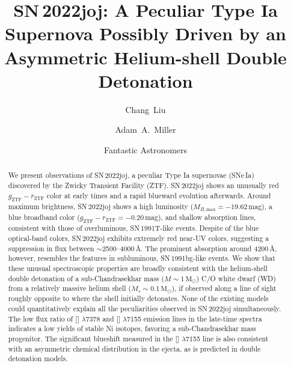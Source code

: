 \documentclass[twocolumn]{aastex631}
\begin{document}
\begin{CJK*}{UTF8}{gbsn}

\title{SN\,2022joj: A Peculiar Type Ia Supernova Possibly Driven by an Asymmetric Helium-shell Double Detonation}

\author[0000-0002-7866-4531]{Chang~Liu}

\author[0000-0001-9515-478X]{Adam~A.~Miller}

\author{Fantastic Astronomers}
\begin{abstract} 
%
We present observations of SN\,2022joj, a peculiar Type Ia supernovae (SNe\,Ia) discovered by the Zwicky Transient Facility (ZTF). SN\,2022joj shows an unusually red $g_\mathrm{ZTF}-r_\mathrm{ZTF}$ color at early times and a rapid blueward evolution afterwards. Around maximum brightness, SN\,2022joj shows a high luminosity ($M_{B,\mathrm{max}}=-19.62$\,mag), a blue broadband color ($g_\mathrm{ZTF}-r_\mathrm{ZTF}=-0.20$\,mag), and shallow  absorption lines, consistent with those of overluminous, SN\,1991T-like events. Despite of the blue optical-band colors, SN\,2022joj exhibits extremely red near-UV colors, suggesting a suppression in flux between $\sim$2500--4000\,\r{A}. The prominent absorption around 4200\,\r{A}, however, resembles the  features in subluminous, SN\,1991bg-like events. We show that these unusual spectroscopic properties are broadly consistent with the helium-shell double detonation of a sub-Chandrasekhar mass ($M\sim1\,\mathrm{M_\odot}$) C/O white dwarf (WD) from a relatively massive helium shell ($M_s\sim0.1\,\mathrm{M_\odot}$), if observed along a line of sight roughly opposite to where the shell initially detonates. None of the existing models could quantitatively explain all the peculiarities observed in SN\,2022joj simultaneously. The low flux ratio of [] $\lambda$7378 and [] $\lambda$7155 emission lines in the late-time spectra indicates a low yields of stable Ni isotopes, favoring a sub-Chandrasekhar mass progenitor. The significant blueshift measured in the [] $\lambda$7155 line is also consistent with an asymmetric chemical distribution in the ejecta, as is predicted in double detonation models.
%
\end{abstract}


\end{CJK*}
\end{document}

